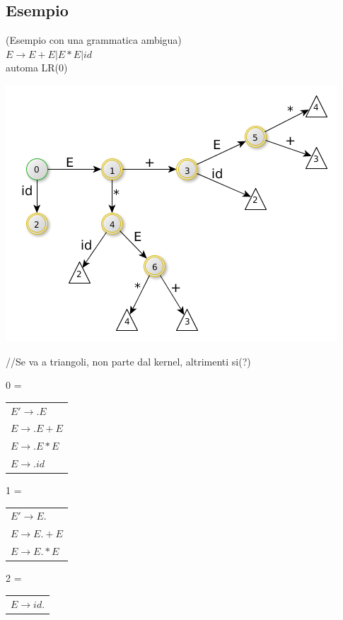 \subsection{Esempio}
(Esempio con una grammatica ambigua)\\

$E \rightarrow E + E | E * E | id $\\
automa LR(0)

\begin{center}
    \includegraphics[scale=0.4]{Chapters/Img/c02_17.png}\\
\end{center} 

//Se va a triangoli, non parte dal kernel, altrimenti si(?)

0 =
\begin{tabular}{l}
	$E' \rightarrow .E$		\\
	$E \rightarrow .E + E$	\\
	$E \rightarrow .E * E$	\\
	$E \rightarrow .id$		\\
\end{tabular}

1 =
\begin{tabular}{l}
	$E' \rightarrow E.$		\\
	$E \rightarrow E. + E$	\\
	$E \rightarrow E. * E$	\\
\end{tabular}

2 =
\begin{tabular}{l}
	$E \rightarrow id.$		\\
\end{tabular}

